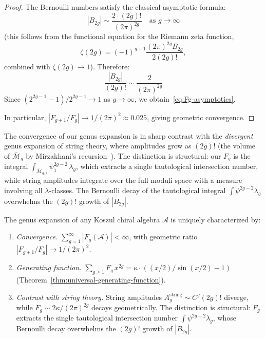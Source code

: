 \begin{proof}
The Bernoulli numbers satisfy the classical asymptotic formula:
\[
|B_{2g}| \sim \frac{2 \cdot (2g)!}{(2\pi)^{2g}} \quad \text{as } g \to \infty
\]
(this follows from the functional equation for the Riemann zeta function,
\[
\zeta(2g) = (-1)^{g+1} \frac{(2\pi)^{2g} B_{2g}}{2(2g)!},
\]
combined with $\zeta(2g) \to 1$).  Therefore:
\[
\frac{|B_{2g}|}{(2g)!} \sim \frac{2}{(2\pi)^{2g}}
\]
Since $(2^{2g-1}-1)/2^{2g-1} \to 1$ as $g \to \infty$, we obtain~\eqref{eq:Fg-asymptotics}.

In particular, $|F_{g+1}/F_g| \to 1/(2\pi)^2 \approx 0.025$, giving geometric convergence.
\end{proof}

\begin{remark}\label{rem:convergence-vs-string}
The convergence of our genus expansion is in sharp contrast with the \emph{divergent} genus expansion of string theory, where amplitudes grow as $(2g)!$ (the volume of $\overline{\mathcal{M}}_g$ by Mirzakhani's recursion~\cite{Mirzakhani}).  The distinction is structural: our $F_g$ is the integral $\int_{\overline{\mathcal{M}}_{g,1}} \psi_1^{2g-2}\, \lambda_g$, which extracts a single tautological intersection number, while string amplitudes integrate over the full moduli space with a measure involving all $\lambda$-classes.  The Bernoulli decay of the tautological integral $\int \psi^{2g-2}\lambda_g$ overwhelms the $(2g)!$ growth of $|B_{2g}|$.
\end{remark}

\begin{theorem}\label{thm:bernoulli-universality}
The genus expansion of any Koszul chiral algebra $\mathcal{A}$ is uniquely characterized by:
\begin{enumerate}[label=\textup{(\roman*)}]
\item \emph{Convergence.} $\sum_{g=1}^\infty |F_g(\mathcal{A})| < \infty$, with geometric ratio $|F_{g+1}/F_g| \to 1/(2\pi)^2$.
\item \emph{Generating function.} $\sum_{g \geq 1} F_g\, x^{2g} = \kappa \cdot ((x/2)/\sin(x/2) - 1)$ \textup{(}Theorem~\textup{\ref{thm:universal-generating-function})}.
\item \emph{Contrast with string theory.} String amplitudes $A_g^{\mathrm{string}} \sim C^g (2g)!$ diverge, while $F_g \sim 2\kappa/(2\pi)^{2g}$ decays geometrically. The distinction is structural: $F_g$ extracts the single tautological intersection number $\int \psi^{2g-2}\lambda_g$, whose Bernoulli decay overwhelms the $(2g)!$ growth of $|B_{2g}|$.
\end{enumerate}
\end{theorem}

